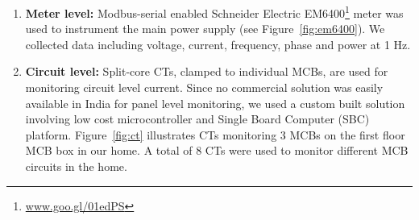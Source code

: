 \documentclass[10pt]{sensys-proc}
\newcommand{\figref}[1]{Figure~\ref{#1}}
\newcommand{\denselistbib}{
  \itemsep -.6pt\topsep-4pt\partopsep-20pt
}
\begin{document}
\begin{enumerate}[leftmargin=1em]\denselistbib
\vspace{-1.5mm}\item {} \textbf{Meter level:} Modbus-serial enabled Schneider Electric EM6400\footnote{\url{www.goo.gl/01edPS}} meter was used to instrument the main power supply (see \figref{fig:em6400}). %
We collected data including voltage, current, frequency, phase and power at 1 Hz. 

\vspace{-1.5mm} \item \textbf{Circuit level:} Split-core CTs, clamped to individual MCBs, are used for monitoring circuit level current. Since no commercial solution was easily available in India for panel level monitoring, we used a custom built solution involving low cost microcontroller and Single Board Computer (SBC) platform. %
\figref{fig:ct} illustrates CTs monitoring 3 MCBs on the first floor MCB box in our home. %
A total of 8 CTs were used to monitor different MCB circuits in the home.


\end{enumerate}
\end{document}

